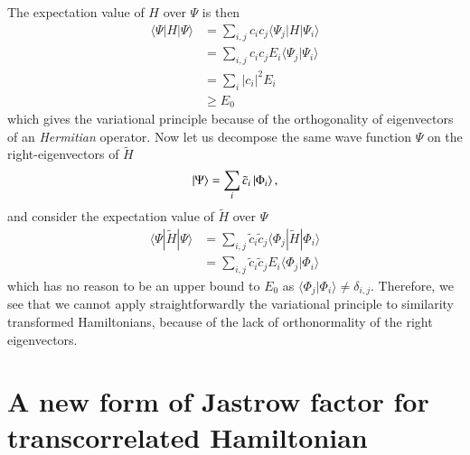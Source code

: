 \documentclass[aip,jcp,reprint,noshowkeys,superscriptaddress]{revtex4-1}
\newcommand{\overlap}[2]{\langle #1 | #2 \rangle}
\newcommand{\matelem}[3]{\langle #1 | #2 | #3 \rangle}
\begin{document}
The expectation value of $H$ over $\Psi$ is then 
\begin{equation}
 \begin{aligned}
  \matelem{\Psi}{H}{\Psi} & = \sum_{i,j} c_i c_j \matelem{\Psi_j}{H}{\Psi_i} \\
                          & = \sum_{i,j} c_i c_j  E_i \overlap{\Psi_j}{\Psi_i} \\
                          & = \sum_{i} |c_i|^2 E_i \\
                          & \ge E_0
 \end{aligned}
\end{equation}
which gives the variational principle because of the orthogonality of eigenvectors of an \textit{Hermitian} operator. 
Now let us decompose the same wave function $\Psi$ on the right-eigenvectors of $\tilde{H}$ 
\begin{equation}
 \ket{\Psi} = \sum_i \tilde{c}_i \ket{\Phi_i},
\end{equation}
and consider the expectation value of $\tilde{H}$ over $\Psi$
\begin{equation}
 \begin{aligned}
  \matelem{\Psi}{\tilde{H}}{\Psi} & = \sum_{i,j} \tilde{c}_i \tilde{c}_j \matelem{\Phi_j}{\tilde{H}}{\Phi_i} \\
                                  & = \sum_{i,j} \tilde{c}_i \tilde{c}_j E_i \overlap{\Phi_j}{\Phi_i} 
 \end{aligned}
\end{equation}
which has no reason to be an upper bound to $E_0$ as $\overlap{\Phi_j}{\Phi_i} \ne \delta_{i,j}$. 
Therefore, we see that we cannot apply straightforwardly the variational principle 
to similarity transformed Hamiltonians, because of the lack of orthonormality of the right eigenvectors.  

\section{A new form of Jastrow factor for transcorrelated Hamiltonian}
\end{document}
